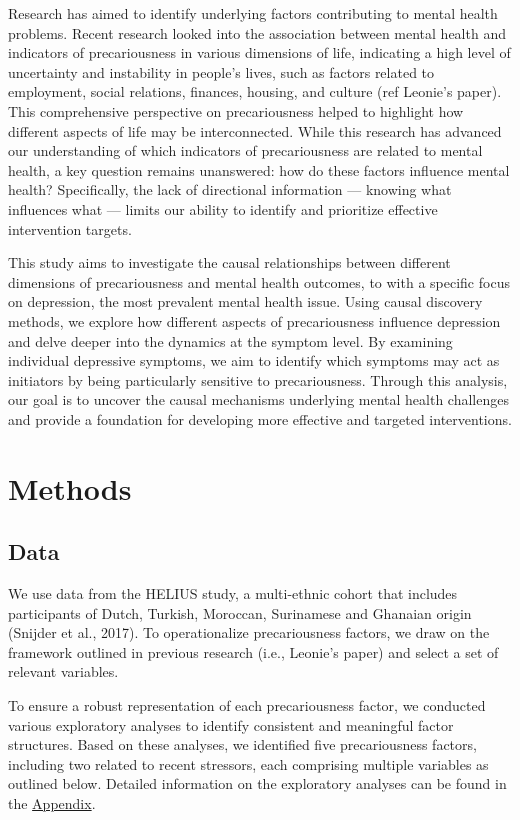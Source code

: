 \documentclass[
]{article}
\begin{document}
Research has aimed to identify underlying factors contributing to mental
health problems. Recent research looked into the association between
mental health and indicators of precariousness in various dimensions of
life, indicating a high level of uncertainty and instability in people's
lives, such as factors related to employment, social relations,
finances, housing, and culture (ref Leonie's paper). This comprehensive
perspective on precariousness helped to highlight how different aspects
of life may be interconnected. While this research has advanced our
understanding of which indicators of precariousness are related to
mental health, a key question remains unanswered: how do these factors
influence mental health? Specifically, the lack of directional
information --- knowing what influences what --- limits our ability to
identify and prioritize effective intervention targets.

This study aims to investigate the causal relationships between
different dimensions of precariousness and mental health outcomes, to
with a specific focus on depression, the most prevalent mental health
issue. Using causal discovery methods, we explore how different aspects
of precariousness influence depression and delve deeper into the
dynamics at the symptom level. By examining individual depressive
symptoms, we aim to identify which symptoms may act as initiators by
being particularly sensitive to precariousness. Through this analysis,
our goal is to uncover the causal mechanisms underlying mental health
challenges and provide a foundation for developing more effective and
targeted interventions.

\section{Methods}\label{methods}

\subsection{Data}\label{data}

We use data from the HELIUS study, a multi-ethnic cohort that includes
participants of Dutch, Turkish, Moroccan, Surinamese and Ghanaian origin
(Snijder et al., 2017). To operationalize precariousness factors, we
draw on the framework outlined in previous research (i.e., Leonie's
paper) and select a set of relevant variables.

To ensure a robust representation of each precariousness factor, we
conducted various exploratory analyses to identify consistent and
meaningful factor structures. Based on these analyses, we identified
five precariousness factors, including two related to recent stressors,
each comprising multiple variables as outlined below. Detailed
information on the exploratory analyses can be found in the
\hyperref[sec-appendix]{Appendix}.
\end{document}
